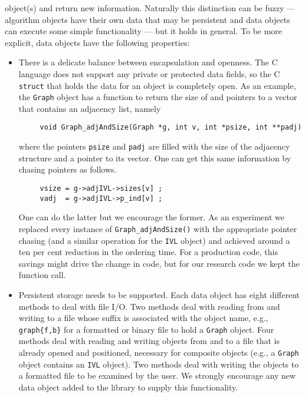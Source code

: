 object(s) and return new information.
Naturally this distinction can be fuzzy --- algorithm objects have
their own data that may be persistent and data objects can execute
some simple functionality --- but it holds in general.
To be more explicit, data objects have the following properties:
\begin{itemize}
\item
There is a delicate balance between encapsulation and openness.
The C language does not support any private or protected data
fields, so the C {\tt struct} that holds the data for an object
is completely open.
As an example, the {\tt Graph} object has a function to return the
size of and pointers to a vector that contains an adjacency list,
namely
\begin{verbatim}
     void Graph_adjAndSize(Graph *g, int v, int *psize, int **padj)
\end{verbatim}
where the pointers {\tt psize} and {\tt padj} are filled with the
size of the adjacency structure and a pointer to its vector.
One can get this same information by chasing pointers as follows.
\begin{verbatim}
     vsize = g->adjIVL->sizes[v] ;
     vadj  = g->adjIVL->p_ind[v] ;
\end{verbatim}
One can do the latter but we encourage the former.
As an experiment we replaced every instance of 
{\tt Graph\_adjAndSize()} with the appropriate pointer chasing
(and a similar operation for the {\tt IVL} object) and achieved
around a ten per cent reduction in the ordering time.
For a production code, this savings might drive the change in code,
but for our research code we kept the function call.
\item
Persistent storage needs to be supported.
Each data object has eight different methods to deal with file I/O.
Two methods deal with reading from and writing to a file whose
suffix is associated with the object name, e.g., {\tt *graph\{f,b\}}
for a formatted or binary file to hold a {\tt Graph} object.
Four methods deal with reading and writing objects from and to a
file that is already opened and positioned, necessary for composite
objects (e.g., a {\tt Graph} object contains an {\tt IVL} object).
Two methods deal with writing the objects to a formatted file to be
examined by the user.
We strongly encourage any new data object added to the library to 
supply this functionality.

\end{itemize}
